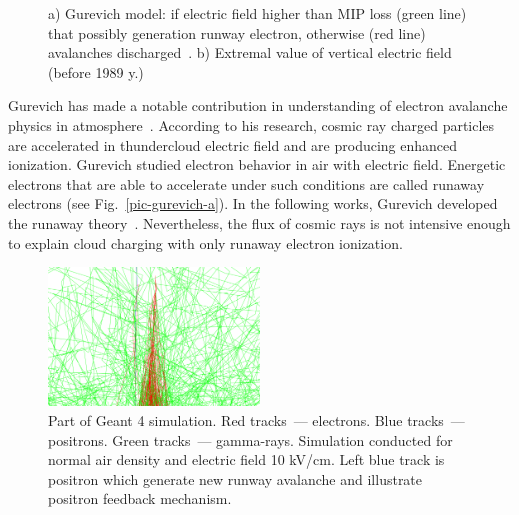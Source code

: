 \documentclass[utf8]{webofc}
\begin{document}
\begin{figure}[ht!]
\begin{subfigure}[b]{0.5\textwidth}
            \caption{}
            \label{pic-field-b}
        \end{subfigure}
        \caption{
            a) Gurevich model: if electric field higher than MIP loss (green line) that possibly generation runway electron, otherwise (red line) avalanches discharged~\cite{gurevich1992runaway}.
            b) Extremal value of vertical electric field (before 1989 y.)~\cite{mazin1989clouds}}
    \end{figure}
    
    Gurevich has made a notable contribution in understanding of electron avalanche physics in atmosphere~\cite{gurevich1992runaway}. According to his research, cosmic ray charged particles are accelerated in thundercloud electric field and are producing enhanced ionization. Gurevich studied electron behavior in air with electric field. Energetic electrons that are able to accelerate under such conditions are called runaway electrons (see Fig.~\ref{pic-gurevich-a}). In the following works, Gurevich developed the runaway theory~\cite{gurevich1999lightning,gurevich2001kinetic}. Nevertheless, the flux of cosmic rays is not intensive enough to explain cloud charging with only runaway electron ionization.
    \begin{figure}[t]
        \centering
        \includegraphics[width=0.5\textwidth]{pictures/10_dwyer}
        
        
        
        \caption{Part of Geant 4 simulation. Red tracks~--- electrons. Blue tracks~--- positrons. Green tracks~--- gamma-rays. Simulation conducted for normal air density and electric field 10 kV/cm. Left blue track is positron which generate new runway avalanche and illustrate positron feedback mechanism.}
        \label{pic-dwyer-a}   
    \end{figure}
    
\end{document}
